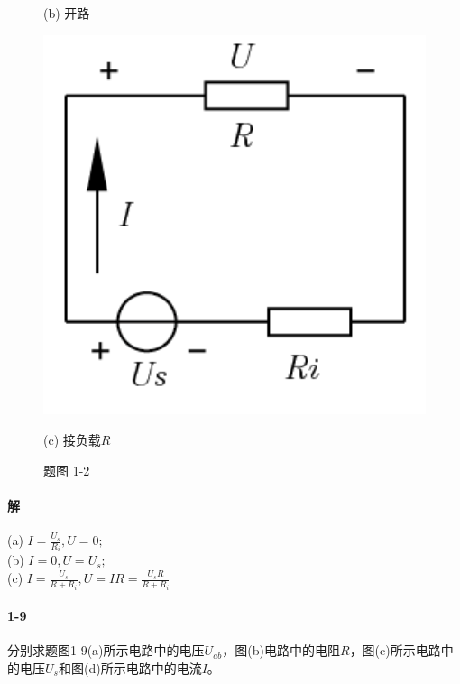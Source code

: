 \documentclass[hyperref, UTF8]{ctexart}
\begin{document}
\begin{figure}[!htb]
\begin{minipage}[t]{0.192\textwidth}
    \caption*{(b) 开路}
  \end{minipage}
  \begin{minipage}[t]{0.180\textwidth}
    \centering
    \includegraphics[width=1\textwidth]{p1-2-c.png}
    \caption*{(c) 接负载$R$}
  \end{minipage}
  \caption*{题图 1-2}
\end{figure}

\paragraph{解} (a) $I=\frac{U_s}{R_i}, U=0;$ \\

(b) $I=0, U=U_s; $ \\

(c) $I=\frac{U_s}{R+R_i}, U=IR=\frac{U_sR}{R+R_i}$ \\

\paragraph{1-9} \label{1-9}
分别求题图1-9(a)所示电路中的电压$U_{ab}$，图(b)电路中的电阻$R$，图(c)所示电路中的电压$U_s$和图(d)所示电路中的电流$I$。\\
\end{document}
